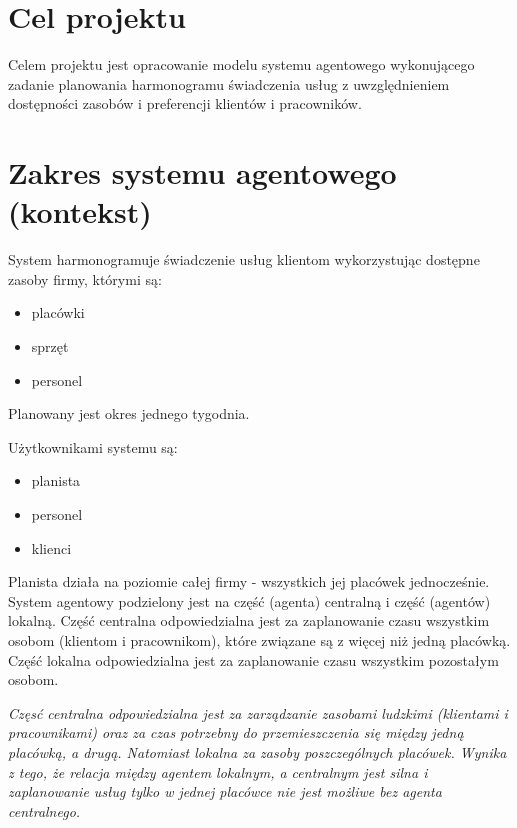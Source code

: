 \documentclass[oneside]{article}
\begin{document}

\section{Cel projektu}
Celem projektu jest opracowanie modelu systemu agentowego
wykonującego zadanie planowania harmonogramu świadczenia usług
z uwzględnieniem dostępności zasobów i preferencji klientów i pracowników.

\section{Zakres systemu agentowego (kontekst)} \label{Zakres}
System harmonogramuje świadczenie usług klientom wykorzystując dostępne zasoby firmy, którymi są:
\begin{itemize}
	\item{placówki}
	\item{sprzęt}
	\item{personel}
\end{itemize}
Planowany jest okres jednego tygodnia.

Użytkownikami systemu są:
\begin{itemize}
	\item{planista}
	\item{personel}
	\item{klienci}
\end{itemize}
Planista działa na poziomie całej firmy - wszystkich jej placówek jednocześnie.
System agentowy podzielony jest na część (agenta) centralną i część (agentów)
lokalną. Część centralna odpowiedzialna jest za zaplanowanie czasu wszystkim
osobom (klientom i pracownikom), które związane są z więcej niż jedną placówką.
Część lokalna odpowiedzialna jest za zaplanowanie czasu wszystkim pozostałym
osobom.

\emph{Częsć centralna odpowiedzialna jest za zarządzanie zasobami ludzkimi (klientami i pracownikami)
 oraz za czas potrzebny do przemieszczenia się między jedną placówką, a drugą.
Natomiast lokalna za zasoby poszczególnych placówek.
Wynika z tego, że relacja między agentem lokalnym, a centralnym jest silna i zaplanowanie
usług tylko w jednej placówce nie jest możliwe bez agenta centralnego.}







\end{document}
